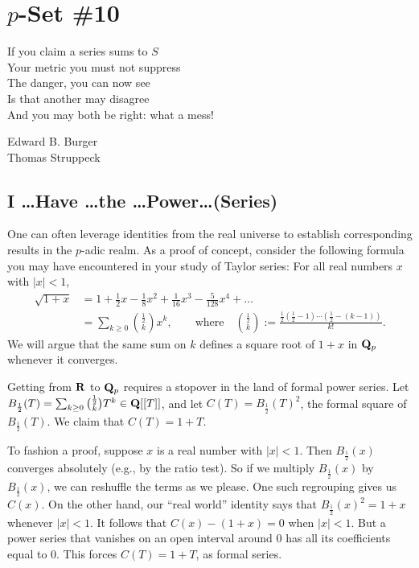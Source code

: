 \chapter*{$p$-Set \#10}

\setlength{\epigraphwidth}{2.35in}
\renewcommand{\epigraphflush}{flushright}
\epigraph{If you claim a series sums to $S$\\
Your metric you must not suppress\\
The danger, you can now see \\
Is that another may disagree \\
And you may both be right: what a mess!}{Edward B. Burger\\ Thomas Struppeck}

\section*{I \dots Have \dots the \dots Power\dots (Series)}
One can often leverage identities from the real universe to establish corresponding results in the $p$-adic realm. As a proof of concept, consider the following formula you may have encountered in your study of Taylor series: For all real numbers $x$ with $|x| < 1$, 
\begin{align*} \sqrt{1+x} &= 1 +\frac12 x -\frac18 x^2 + \frac1{16} x^3 - \frac{5}{128}x^4+\dots
\\ 
&=\sum_{k\ge 0} \binom{\frac12}{k} x^k, \qquad\text{where}\quad\binom{\frac12}{k} := \frac{\frac{1}{2}(\frac{1}{2}-1)\cdots(\frac{1}{2}-(k-1))}{k!}. \end{align*}
We will argue that the same sum on $k$ defines a square root of $1+x$ in $\mathbf{Q}_p$ whenever it converges.

Getting from $\mathbf{R}$ to $\mathbf{Q}_p$ requires a stopover in the land of formal power series. Let $B_{\frac12}(T) = \sum_{k\ge 0} \binom{\frac12}{k} T^k \in \mathbf{Q}[[T]]$, and let $C(T) = B_{\frac 12}(T)^2$, the formal square of $B_{\frac{1}{2}}(T)$. We claim that $C(T)=1+T$.

To fashion a proof, suppose $x$ is a real number with $|x|<1$. Then $B_{\frac12}(x)$ converges absolutely (e.g., by the ratio test). So if we multiply $B_{\frac12}(x)$ by $B_{\frac12}(x)$, we can reshuffle the terms as we please. One such regrouping gives us $C(x)$. On the other hand, our ``real world'' identity says that $B_{\frac12}(x)^2 = 1+x$ whenever $|x| < 1$. It follows that $C(x) - (1+x)=0$ when $|x| < 1$. But a power series that vanishes on an open interval around $0$ has all its coefficients equal to $0$. This forces $C(T) = 1+T$, as formal series.

